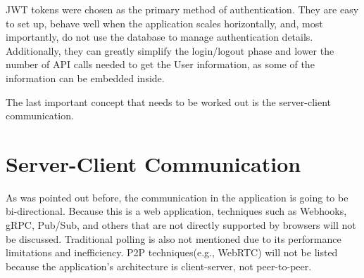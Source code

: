 JWT tokens were chosen as the primary method of authentication. They are easy to set up, behave well when the
application scales horizontally, and, most importantly, do not use the database to manage authentication details.
Additionally, they can greatly simplify the login/logout phase and lower the number of API calls needed to get the
User information, as some of the information can be embedded inside.

The last important concept that needs to be worked out is the server-client communication.


\section{Server-Client Communication}
As was pointed out before, the communication in the application is going to be bi-directional.
Because this is a web application, techniques such as Webhooks, gRPC, Pub/Sub, and others that are not directly supported by browsers will not be discussed. Traditional polling is also not mentioned due
to its performance limitations and inefficiency. P2P techniques(e.g., WebRTC) will not be listed
because the application's architecture is client-server, not peer-to-peer.

